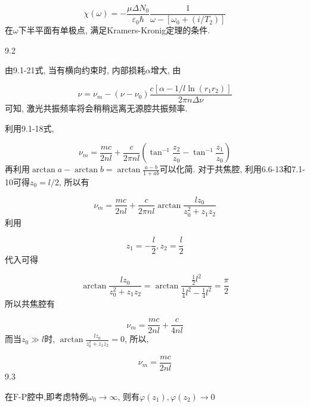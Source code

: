 \[\chi(\omega)=-\frac{\mu \Delta N_{0}}{\varepsilon_{0} \hbar} \frac{1}{\omega-\left[\omega_{0}+\left(i / T_{2}\right)\right]} \]
在\(\omega\)下半平面有单极点, 满足Kramers-Kronig定理的条件.








9.2

由9.1-21式, 当有横向约束时, 内部损耗\(\alpha\)增大, 由

\[\nu=\nu_{m}-\left(\nu-\nu_{0}\right)\frac{c\left[\alpha-1/l \ln\left(r_{1} r_{2}\right)\right]}{2 \pi n \Delta \nu} \]
可知, 激光共振频率将会稍稍远离无源腔共振频率.

利用9.1-18式,

\[\nu_{m}=\frac{m c}{2 n l}+\frac{c}{2 \pi n l}\left(\tan ^{-1} \frac{z_{2}}{z_{0}}-\tan ^{-1} \frac{z_{1}}{z_{0}}\right) \]
再利用\(\arctan a-\arctan b=\arctan \frac{a-b}{1+a b}\)可以化简. 对于共焦腔, 利用6.6-13和7.1-10可得\(z_0=l/2\), 所以有

\[\nu_{m}=\frac{m c}{2 n l}+\frac{c}{2 \pi n l} \arctan \frac{l z_{0}}{z_{0}^{2}+z_{1} z_{2}} \]
利用

\[z_{1}=-\frac{l}{2}, z_{2}=\frac{l}{2} \]
代入可得

\[\arctan \frac{l z_{0}}{z_{0}^{2}+z_{1} z_{2}}=\arctan \frac{\frac{1}{2} l^{2}}{\frac{1}{4} l^{2}-\frac{1}{4} l^{2}}=\frac{\pi}{2} \]
所以共焦腔有

\[\nu_{m}=\frac{m c}{2 n l}+\frac{c}{4 n l} \]
而当\(z_0\gg l\)时, \(\arctan \frac{l z_{0}}{z_{0}^{2}+z_1z_{2}}=0\), 所以,

\[\nu_{m}=\frac{m c}{2 n l} \]
9.3

在\(\text{F-P}\)腔中,即考虑特例\(\omega_0\to\infty\), 则有\(\varphi(z_1),\varphi(z_2)\to0\)

